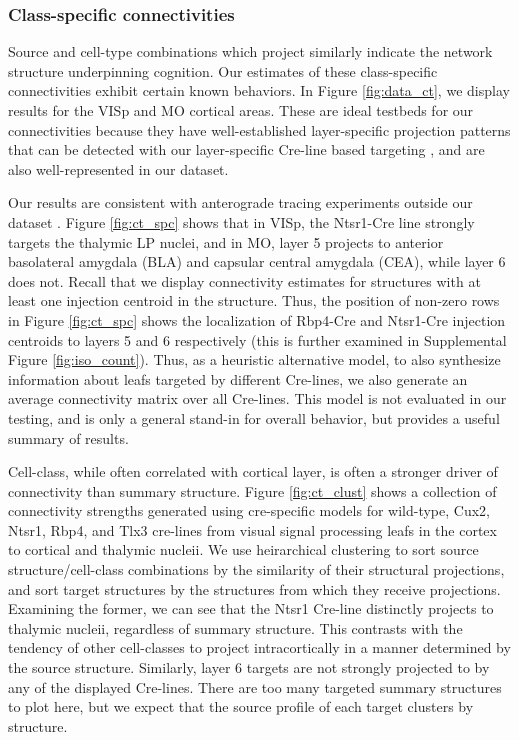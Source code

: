 \newpage
\subsubsection{Class-specific connectivities}

Source and cell-type combinations which project similarly indicate the network structure underpinning cognition.
Our estimates of these class-specific connectivities exhibit certain known behaviors.
In Figure \ref{fig:data_ct}, we display results for the VISp and MO cortical areas.
These are ideal testbeds for our connectivities because they have well-established layer-specific projection patterns that can be detected with our layer-specific Cre-line based targeting \citet{Jeong2016-dc}, and are also well-represented in our dataset.

Our results are consistent with anterograde tracing experiments outside our dataset \citet{Jeong2016-dc}.
Figure \ref{fig:ct_spc} shows that in VISp, the Ntsr1-Cre line strongly targets the thalymic LP nuclei, and in MO, layer 5 projects to anterior basolateral amygdala (BLA) and capsular central amygdala (CEA), while layer 6 does not.
Recall that we display connectivity estimates for structures with at least one injection centroid in the structure.
Thus, the position of non-zero rows in Figure \ref{fig:ct_spc} shows the localization of Rbp4-Cre and Ntsr1-Cre injection centroids to layers 5 and 6 respectively (this is further examined in Supplemental Figure \ref{fig:iso_count}).
Thus, as a heuristic alternative model, to also synthesize information about leafs targeted by different Cre-lines, we also generate an average connectivity matrix over all Cre-lines.
This model is not evaluated in our testing, and is only a general stand-in for overall behavior, but provides a useful summary of results.

Cell-class, while often correlated with cortical layer, is often a stronger driver of connectivity than summary structure.
Figure \ref{fig:ct_clust} shows a collection of connectivity strengths generated using cre-specific models for wild-type, Cux2, Ntsr1, Rbp4, and Tlx3 cre-lines from visual signal processing leafs in the cortex to cortical and thalymic nucleii.
We use heirarchical clustering to sort source structure/cell-class combinations by the similarity of their structural projections, and sort target structures by the structures from which they receive projections.
Examining the former, we can see that the Ntsr1 Cre-line distinctly projects to thalymic nucleii, regardless of summary structure.
This contrasts with the tendency of other cell-classes to project intracortically in a manner determined by the source structure.
Similarly, layer 6 targets are not strongly projected to by any of the displayed Cre-lines.
There are too many targeted summary structures to plot here, but we expect that the source profile of each target clusters by structure.

